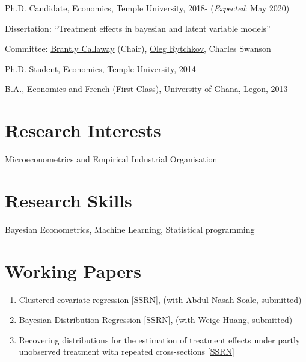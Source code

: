 \documentclass[letterpaper]{article}
\renewenvironment{itemize}{
  \begin{list}{}{
    \setlength{\leftmargin}{1.5em}
  }
}{
  \end{list}
}
\begin{document}
\begin{itemize}
  \item Ph.D. Candidate, Economics, Temple University, 2018- (\textit{Expected}: May 2020)

  \begin{itemize}
    \item Dissertation: ``Treatment effects in bayesian and latent variable
    models''
    \item Committee:   \href{https://bcallaway11.github.io/index.html}
    {Brantly Callaway} (Chair), \href{https://astro.temple.edu/~rytchkov/}{Oleg Rytchkov}, Charles Swanson 
  \end{itemize}

	\item Ph.D. Student, Economics, Temple University, 2014-

  \item B.A., Economics and French (First Class), University of Ghana, Legon, 2013
\end{itemize}

\section*{Research Interests}
\begin{itemize}
  \item Microeconometrics and Empirical Industrial Organisation
\end{itemize}

\section*{Research Skills}
\begin{itemize}
	\item Bayesian Econometrics, Machine Learning, Statistical programming
\end{itemize}

\section*{Working Papers}
\begin{enumerate}
	\item Clustered covariate regression [\href{https://papers.ssrn.com/sol3/papers.cfm?abstract_id=3394012}{SSRN}], (with Abdul-Nasah Soale, submitted)
	\item Bayesian Distribution Regression [\href{https://papers.ssrn.com/sol3/papers.cfm?abstract_id=3048658}{SSRN}], (with Weige Huang, submitted)
	\item Recovering distributions for the estimation of treatment
	effects under partly unobserved treatment with repeated
	cross-sections  [\href{https://papers.ssrn.com/sol3/papers.cfm?abstract_id=3194286}{SSRN}] 
\end{enumerate}
\end{document}
